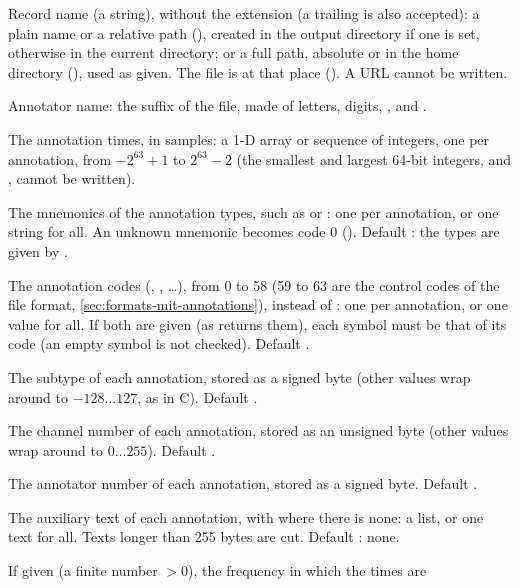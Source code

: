 \begin{params}
\item[record] Record name (a string), without the  extension (a trailing
   is also accepted): a plain name or a relative path (),
  created in the output directory if one is set, otherwise in the current directory; or a
  full path, absolute or in the home directory (),
  used as given. The file is  at that place
  (). A URL cannot be written.
\item[annotator] Annotator name: the suffix of the file, made of letters, digits,
  \code{\_}, \code{-} and \code{\textasciitilde}.
\item[samples] The annotation times, in samples: a 1-D array or sequence of integers, one
  per annotation, from $-2^{63}+1$ to $2^{63}-2$ (the smallest and largest 64-bit
  integers,  and , cannot be written).
\item[symbols] The mnemonics of the annotation types, such as  or :
  one per annotation, or one string for all. An unknown mnemonic becomes code 0
  (). Default : the types are given by .
\item[codes] The annotation codes (, , \ldots), from
  0 to 58 (59 to 63 are the control codes of the file format, \cref{sec:formats-mit-annotations}),
  instead of : one per annotation, or one value for all. If both are given
  (as  returns them), each symbol must be that of its code (an
  empty symbol is not checked). Default .
\item[subtypes] The subtype of each annotation, stored as a signed byte (other values wrap
  around to $-128 \ldots 127$, as in C). Default .
\item[chans] The channel number of each annotation, stored as an unsigned byte (other
  values wrap around to $0 \ldots 255$). Default .
\item[nums] The annotator number of each annotation, stored as a signed byte. Default
  .
\item[aux] The auxiliary text of each annotation, with  where there is none:
  a list, or one text for all. Texts longer than 255 bytes are cut. Default :
  none.
\item[fs] If given (a finite number $> 0$), the frequency in which the times are

\end{params}
